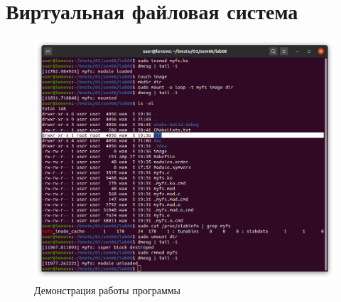 \documentclass[a4paper,oneside,12pt]{extreport}
\begin{document}


\section*{Виртуальная файловая система}



\begin{figure}[H]
	\centering
	\includegraphics[width=\linewidth]{inc/img/myfs}
	\caption{Демонстрация работы программы}
	\label{img:myfs}
\end{figure}
\end{document}
